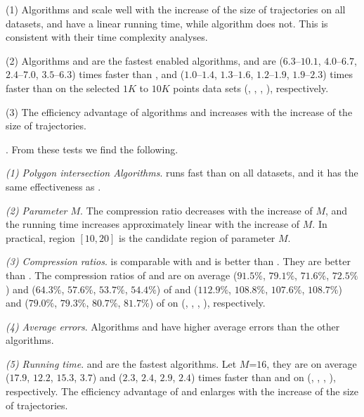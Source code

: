 \ni(1) Algorithms \cist and \cista scale well with the increase of the size of trajectories on all datasets,
and have a linear running time, while algorithm \dps does not.
This is consistent with their time complexity analyses.

\ni\textcolor[rgb]{1.00,0.00,0.00}{(2)} Algorithms \cist and \cista are the fastest \sed enabled \lsa algorithms, and are {($6.3$--$10.1$, $4.0$--$6.7$, $2.4$--$7.0$, $3.5$--$6.3$)} times faster than \dps,
and {($1.0$--$1.4$, $1.3$--$1.6$, $1.2$--$1.9$, $1.9$--$2.3$)} times faster than \squishe on the selected $1K$ to $10K$ points data sets (\truck, \sercar, \geolife, \pricar), respectively.

\ni(3) The efficiency advantage of algorithms \cist and \cista increases with the increase of the size of trajectories.



.
From these tests we find the following.

\ni\emph{(1) Polygon intersection Algorithms}. \rpia runs fast than \cpia on all datasets, and it has the same effectiveness as \cpia.

\ni\emph{(2) Parameter $M$}. The compression ratio decreases with the increase of $M$, and the running time increases approximately linear with the increase of $M$. In practical, region $[10, 20]$ is the candidate region of parameter $M$.

\ni\emph{(3) Compression ratios}. \cist is comparable with \dps and \cista is better than \dps.
They are better than \squishe.
The compression ratios of \cist and \cista are on average ($91.5\%$, $79.1\%$, $71.6\%$, {$72.5\%$}) and ($64.3\%$, $57.6\%$, $53.7\%$, {$54.4\%$}) of \squishe and ($112.9\%$, $108.8\%$, $107.6\%$, $108.7\%$) and ($79.0\%$, $79.3\%$, $80.7\%$, $81.7\%$) of \dps on (\truck, \sercar, \geolife, \pricar), respectively.

\ni\emph{(4) Average errors}. {Algorithms \cist and \cista have higher average errors than the other algorithms.}

\ni\emph{(5) Running time}. \cist and \cista are the fastest algorithms. Let \textcolor[rgb]{0.00,0.07,1.00}{$M$=$16$}, they are on average \textcolor[rgb]{1.00,0.50,0.50}{($17.9$, $12.2$, $15.3$, $3.7$) and ($2.3$, $2.4$, $2.9$, {$2.4$})} times faster than \dps and \squishe on (\truck, \sercar, \geolife, \pricar), respectively.
The efficiency advantage of \cist and \cista enlarges with the increase of the size of trajectories.



